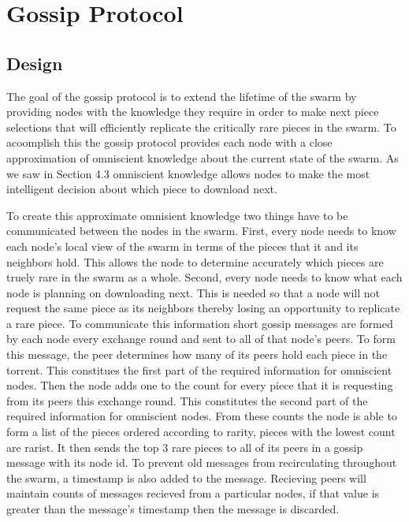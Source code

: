 \section{Gossip Protocol}

\subsection{Design}

The goal of the gossip protocol is to extend the lifetime of the swarm
by providing nodes with the knowledge they require in order to make
next piece selections that will efficiently replicate the critically
rare pieces in the swarm. To acoomplish this the gossip protocol
provides each node with a close approximation of omniscient knowledge
about the current state of the swarm. As we saw in Section 4.3
omniscient knowledge allows nodes to make the most intelligent
decision about which piece to download next. 

To create this approximate omnisient knowledge two things have to be
communicated between the nodes in the swarm. First, every node needs
to know each node's local view of the swarm in terms of the pieces
that it and its neighbors hold. This allows the node to determine
accurately which pieces are truely rare in the swarm as a whole. Second, every
node needs to know what each node is planning on downloading
next. This is needed so that a node will not request the same piece as
its neighbors thereby losing an opportunity to replicate a rare
piece. To communicate this information short gossip messages are
formed by each node every exchange round and sent to all of that
node's peers. To form this message, the peer determines how many of
its peers hold each piece in the torrent. This constitues the first
part of the required information for omniscient nodes. Then the node
adds one to the count for every piece that it is requesting from its
peers this exchange round. This constitutes the second part of the
required information for omniscient nodes. From these counts the node
is able to form a list of the pieces ordered according to rarity,
pieces with the lowest count are rarist. It then sends the top 3 rare
pieces to all of its peers in a gossip message with its node id. To
prevent old messages from recirculating throughout the swarm, a
timestamp is also added to the message. Recieving peers will maintain
counts of messages recieved from a particular nodes, if that value is
greater than the message's timestamp then the message is discarded.


